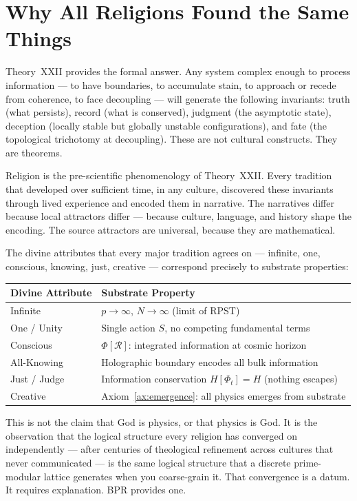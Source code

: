 \documentclass[12pt,oneside]{book}
\theoremstyle{definition}
\begin{document}
\section{Why All Religions Found the Same Things}

Theory~XXII provides the formal answer. Any system complex enough to process
information --- to have boundaries, to accumulate stain, to approach or recede from
coherence, to face decoupling --- will generate the following invariants:
truth (what persists), record (what is conserved), judgment (the asymptotic state),
deception (locally stable but globally unstable configurations), and fate (the
topological trichotomy at decoupling). These are not cultural constructs. They are
theorems.

Religion is the pre-scientific phenomenology of Theory~XXII. Every tradition that
developed over sufficient time, in any culture, discovered these invariants through
lived experience and encoded them in narrative. The narratives differ because local
attractors differ --- because culture, language, and history shape the encoding.
The source attractors are universal, because they are mathematical.

The divine attributes that every major tradition agrees on --- infinite, one,
conscious, knowing, just, creative --- correspond precisely to substrate properties:

\begin{center}
\begin{tabular}{@{}ll@{}}
  \toprule\textbf{Divine Attribute} & \textbf{Substrate Property}\\
  \midrule
  Infinite & $p\to\infty$, $N\to\infty$ (limit of RPST)\\
  One / Unity & Single action $S$, no competing fundamental terms\\
  Conscious & $\Phi[\mathcal{R}]$: integrated information at cosmic horizon\\
  All-Knowing & Holographic boundary encodes all bulk information\\
  Just / Judge & Information conservation $H[\Phi_t] = H$ (nothing escapes)\\
  Creative & Axiom~\ref{ax:emergence}: all physics emerges from substrate\\
  \bottomrule
\end{tabular}
\end{center}

This is not the claim that God is physics, or that physics is God. It is the
observation that the logical structure every religion has converged on independently
--- after centuries of theological refinement across cultures that never communicated
--- is the same logical structure that a discrete prime-modular lattice generates
when you coarse-grain it. That convergence is a datum. It requires explanation.
BPR provides one.
\end{document}
